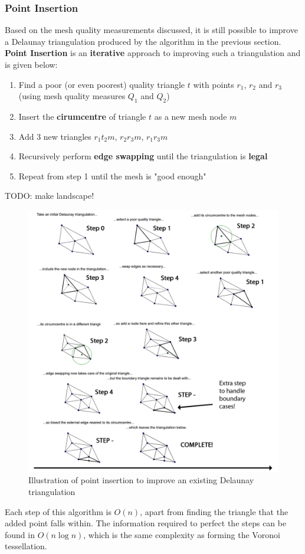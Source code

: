 \documentclass{article}
\begin{document}
\subsubsection{Point Insertion}

Based on the mesh quality measurements discussed, it is still possible to improve a Delaunay triangulation produced by the algorithm in the previous section. \textbf{Point Insertion} is an \textbf{iterative} approach to improving such a triangulation and is given below:
\begin{enumerate}
	\item Find a poor (or even poorest) quality triangle $t$ with points $r_1$, $r_2$ and $r_3$ (using mesh quality measures $Q_1$ and $Q_2$)
	\item Insert the \textbf{cirumcentre} of triangle $t$ as a new mesh node $m$
	\item Add 3 new triangles $r_1t_2m$, $r_2r_3m$, $r_1r_3m$
	\item Recursively perform \textbf{edge swapping} until the triangulation is \textbf{legal}
	\item Repeat from step 1 until the mesh is "good enough"
\end{enumerate}

TODO: make landscape!
\begin{figure}[H]
	\centering
	\includegraphics[scale=0.35]{figures/point-insertion.png}
	\caption{Illustration of point insertion to improve an existing Delaunay triangulation}
	\label{fig:point-insertion-example}
\end{figure}
Each step of this algorithm is $O(n)$, apart from finding the triangle that the added point falls within. The information required to perfect the steps can be found in $O(n\log n)$, which is the same complexity as forming the Voronoi tessellation.
\end{document}

